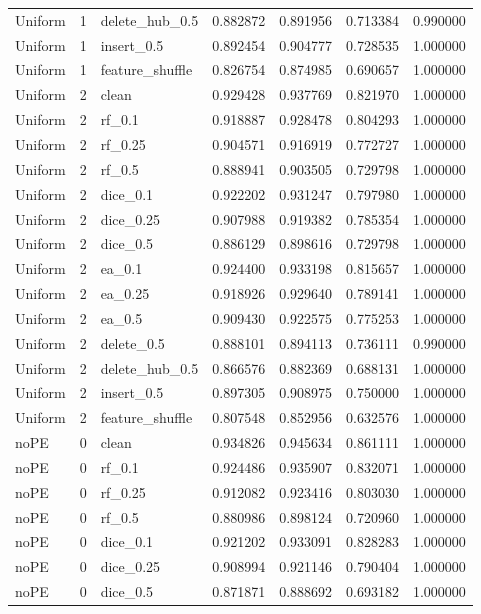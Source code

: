 \documentclass[UTF8,a4paper,11pt,fontset=fandol]{ctexart}
\begin{document}
{\begin{longtable}{lrlrrrr}
Uniform & 1 & delete\_hub\_0.5 & 0.882872 & 0.891956 & 0.713384 & 0.990000 \\
Uniform & 1 & insert\_0.5 & 0.892454 & 0.904777 & 0.728535 & 1.000000 \\
Uniform & 1 & feature\_shuffle & 0.826754 & 0.874985 & 0.690657 & 1.000000 \\
Uniform & 2 & clean & 0.929428 & 0.937769 & 0.821970 & 1.000000 \\
Uniform & 2 & rf\_0.1 & 0.918887 & 0.928478 & 0.804293 & 1.000000 \\
Uniform & 2 & rf\_0.25 & 0.904571 & 0.916919 & 0.772727 & 1.000000 \\
Uniform & 2 & rf\_0.5 & 0.888941 & 0.903505 & 0.729798 & 1.000000 \\
Uniform & 2 & dice\_0.1 & 0.922202 & 0.931247 & 0.797980 & 1.000000 \\
Uniform & 2 & dice\_0.25 & 0.907988 & 0.919382 & 0.785354 & 1.000000 \\
Uniform & 2 & dice\_0.5 & 0.886129 & 0.898616 & 0.729798 & 1.000000 \\
Uniform & 2 & ea\_0.1 & 0.924400 & 0.933198 & 0.815657 & 1.000000 \\
Uniform & 2 & ea\_0.25 & 0.918926 & 0.929640 & 0.789141 & 1.000000 \\
Uniform & 2 & ea\_0.5 & 0.909430 & 0.922575 & 0.775253 & 1.000000 \\
Uniform & 2 & delete\_0.5 & 0.888101 & 0.894113 & 0.736111 & 0.990000 \\
Uniform & 2 & delete\_hub\_0.5 & 0.866576 & 0.882369 & 0.688131 & 1.000000 \\
Uniform & 2 & insert\_0.5 & 0.897305 & 0.908975 & 0.750000 & 1.000000 \\
Uniform & 2 & feature\_shuffle & 0.807548 & 0.852956 & 0.632576 & 1.000000 \\
noPE & 0 & clean & 0.934826 & 0.945634 & 0.861111 & 1.000000 \\
noPE & 0 & rf\_0.1 & 0.924486 & 0.935907 & 0.832071 & 1.000000 \\
noPE & 0 & rf\_0.25 & 0.912082 & 0.923416 & 0.803030 & 1.000000 \\
noPE & 0 & rf\_0.5 & 0.880986 & 0.898124 & 0.720960 & 1.000000 \\
noPE & 0 & dice\_0.1 & 0.921202 & 0.933091 & 0.828283 & 1.000000 \\
noPE & 0 & dice\_0.25 & 0.908994 & 0.921146 & 0.790404 & 1.000000 \\
noPE & 0 & dice\_0.5 & 0.871871 & 0.888692 & 0.693182 & 1.000000 \\

\end{longtable}}
\end{document}
